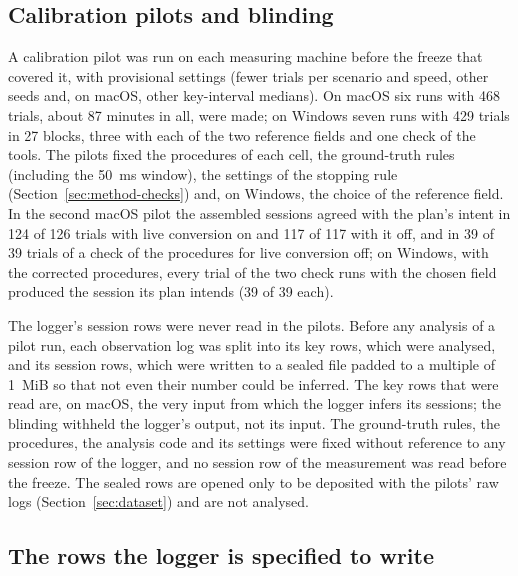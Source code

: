 \subsection{Calibration pilots and blinding}
\label{sec:method-pilots}

A calibration pilot was run on each measuring machine before the freeze that covered it, with provisional settings
(fewer trials per scenario and speed, other seeds and, on macOS, other key-interval medians). On macOS six runs with
468 trials, about 87 minutes in all, were made; on Windows seven runs with 429 trials in 27 blocks, three with each of
the two reference fields and one check of the tools. The pilots fixed the procedures of each cell, the ground-truth
rules (including the 50~ms window), the settings of the stopping rule (Section~\ref{sec:method-checks}) and, on Windows,
the choice of the reference field. In the second macOS pilot the assembled sessions agreed with the plan's intent in
124 of 126 trials with live conversion on and 117 of 117 with it off, and in 39 of 39 trials of a check of the
procedures for live conversion off; on Windows, with the corrected procedures, every trial of the two check runs with
the chosen field produced the session its plan intends (39 of 39 each).

The logger's session rows were never read in the pilots. Before any analysis of a pilot run, each observation log was
split into its key rows, which were analysed, and its session rows, which were written to a sealed file padded to a
multiple of 1~MiB so that not even their number could be inferred. The key rows that were read are, on macOS, the very
input from which the logger infers its sessions; the blinding withheld the logger's output, not its input. The
ground-truth rules, the procedures, the analysis code and its settings were fixed without reference to any session row
of the logger, and no session row of the measurement was read before the freeze. The sealed rows are opened only to be
deposited with the pilots' raw logs (Section~\ref{sec:dataset}) and are not analysed.

\subsection{The rows the logger is specified to write}
\label{sec:method-prediction}

